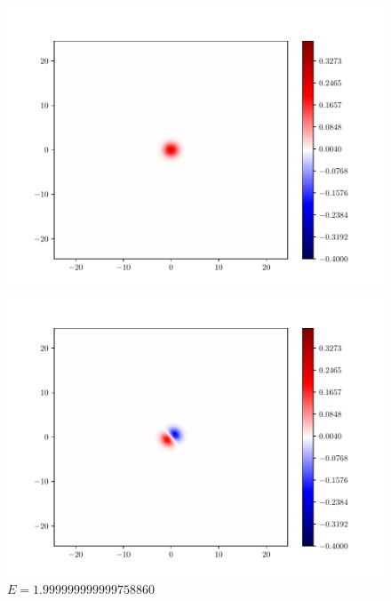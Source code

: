 \documentclass{article}
\begin{document}
\begin{enumerate}[1.]
\begin{enumerate}[(A)]
\begin{enumerate}[(i)]
      \begin{figure}[H]
        \centering
        \begin{minipage}{0.3\linewidth}
          \centering
          \includegraphics[width=\linewidth]{functions-0.pdf}
          \caption*{$E = 0.999999999999999889$}
        \end{minipage}
        \begin{minipage}{0.3\linewidth}
          \centering
          \includegraphics[width=\linewidth]{functions-1.pdf}
          \caption*{$E = 1.999999999999758860$}
        \end{minipage}
        \begin{minipage}{0.3\linewidth}
          \centering

\end{minipage}
\end{figure}
\end{enumerate}
\end{enumerate}
\end{enumerate}
\end{document}
